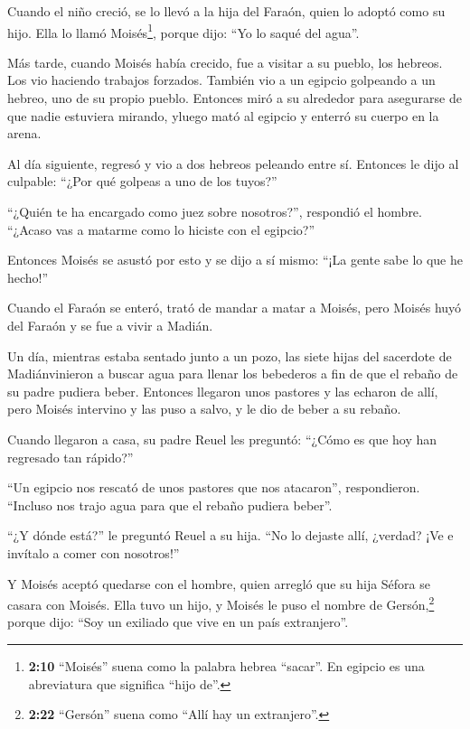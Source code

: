  Cuando el niño creció, se lo llevó a la hija del Faraón,
quien lo adoptó como su hijo. Ella lo llamó Moisés\footnote{\textbf{2:10}
  ``Moisés'' suena como la palabra hebrea ``sacar''. En egipcio es una
  abreviatura que significa ``hijo de''.}, porque dijo: ``Yo lo saqué
del agua''.

 Más tarde, cuando Moisés había crecido, fue a visitar a su
pueblo, los hebreos. Los vio haciendo trabajos forzados. También vio a
un egipcio golpeando a un hebreo, uno de su propio pueblo. 
Entonces miró a su alrededor para asegurarse de que nadie estuviera
mirando, yluego mató al egipcio y enterró su cuerpo en la arena.

 Al día siguiente, regresó y vio a dos hebreos peleando
entre sí. Entonces le dijo al culpable: ``¿Por qué golpeas a uno de los
tuyos?''

 ``¿Quién te ha encargado como juez sobre nosotros?'',
respondió el hombre. ``¿Acaso vas a matarme como lo hiciste con el
egipcio?''

Entonces Moisés se asustó por esto y se dijo a sí mismo: ``¡La gente
sabe lo que he hecho!''

 Cuando el Faraón se enteró, trató de mandar a matar a
Moisés, pero Moisés huyó del Faraón y se fue a vivir a Madián.

Un día, mientras estaba sentado junto a un pozo,  las siete
hijas del sacerdote de Madiánvinieron a buscar agua para llenar los
bebederos a fin de que el rebaño de su padre pudiera beber.
 Entonces llegaron unos pastores y las echaron de allí,
pero Moisés intervino y las puso a salvo, y le dio de beber a su rebaño.

 Cuando llegaron a casa, su padre Reuel les preguntó:
``¿Cómo es que hoy han regresado tan rápido?''

 ``Un egipcio nos rescató de unos pastores que nos
atacaron'', respondieron. ``Incluso nos trajo agua para que el rebaño
pudiera beber''.

 ``¿Y dónde está?'' le preguntó Reuel a su hija. ``No lo
dejaste allí, ¿verdad? ¡Ve e invítalo a comer con nosotros!''

 Y Moisés aceptó quedarse con el hombre, quien arregló que
su hija Séfora se casara con Moisés.  Ella tuvo un hijo, y
Moisés le puso el nombre de Gersón,\footnote{\textbf{2:22} ``Gersón''
  suena como ``Allí hay un extranjero''.} porque dijo: ``Soy un exiliado
que vive en un país extranjero''.

